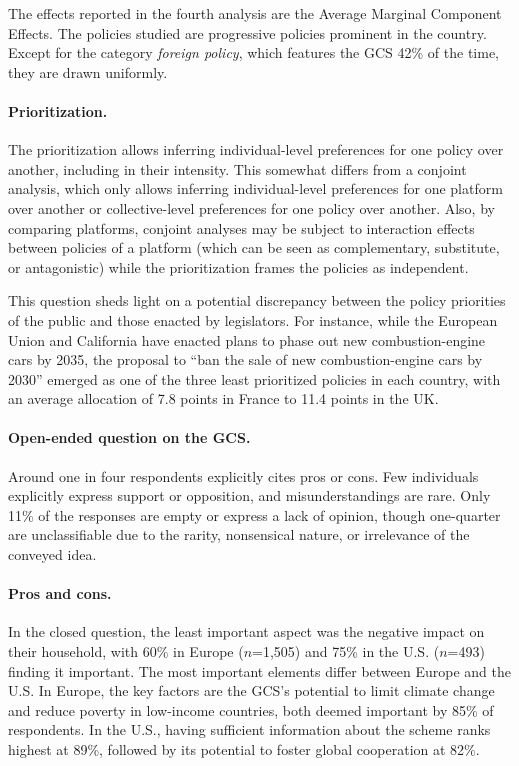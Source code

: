 \begin{bibunit}
\begin{small}
The effects reported in the fourth analysis are the Average Marginal Component Effects.\cite{hainmueller_causal_2014} The policies studied are progressive policies prominent in the country. Except for the category \textit{foreign policy}, which features the GCS 42\% of the time, they are drawn uniformly.

\paragraph{\small Prioritization.}
The prioritization allows inferring individual-level preferences for one policy over another, including in their intensity. This somewhat differs from a conjoint analysis, which only allows inferring individual-level preferences for one platform over another or collective-level preferences for one policy over another. Also, by comparing platforms, conjoint analyses may be subject to interaction effects between policies of a platform (which can be seen as complementary, substitute, or antagonistic) while the prioritization frames the policies as independent.

This question sheds light on a potential discrepancy between the policy priorities of the public and those enacted by legislators. For instance, while the European Union and California have enacted plans to phase out new combustion-engine cars by 2035, the proposal to ``ban the sale of new combustion-engine cars by 2030'' emerged as one of the three least prioritized policies in each country, with an average allocation of 7.8 points in France to 11.4 points in the UK.

\paragraph{\small Open-ended question on the GCS.}
Around one in four respondents explicitly cites pros or cons. Few individuals explicitly express support or opposition, and misunderstandings are rare. Only 11\% of the responses are empty or express a lack of opinion, though one-quarter are unclassifiable due to the rarity, nonsensical nature, or irrelevance of the conveyed idea.

\paragraph{\small Pros and cons.}
In the closed question, the least important aspect was the negative impact on their household, with 60\% in Europe ($n$=1,505) and 75\% in the U.S. ($n$=493) finding it important. The most important elements differ between Europe and the U.S. In Europe, the key factors are the GCS's potential to limit climate change and reduce poverty in low-income countries, both deemed important by 85\% of respondents. In the U.S., having sufficient information about the scheme ranks highest at 89\%, followed by its potential to foster global cooperation at 82\%. 


\end{small}
\end{bibunit}
